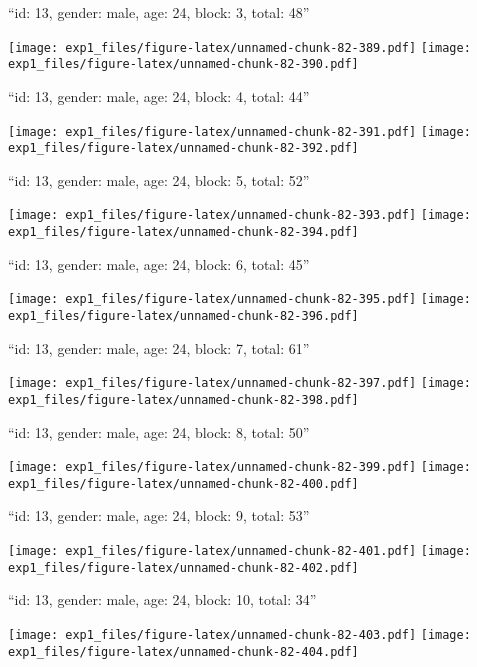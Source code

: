 \documentclass[11pt,,]{article}
\begin{document}
\newpage
[1] 

``id: 13, gender: male, age: 24, block: 3, total: 48''

\texttt{[image: exp1\_files/figure-latex/unnamed-chunk-82-389.pdf]}
\texttt{[image: exp1\_files/figure-latex/unnamed-chunk-82-390.pdf]}

\newpage
[1] 

``id: 13, gender: male, age: 24, block: 4, total: 44''

\texttt{[image: exp1\_files/figure-latex/unnamed-chunk-82-391.pdf]}
\texttt{[image: exp1\_files/figure-latex/unnamed-chunk-82-392.pdf]}

\newpage
[1] 

``id: 13, gender: male, age: 24, block: 5, total: 52''

\texttt{[image: exp1\_files/figure-latex/unnamed-chunk-82-393.pdf]}
\texttt{[image: exp1\_files/figure-latex/unnamed-chunk-82-394.pdf]}

\newpage
[1] 

``id: 13, gender: male, age: 24, block: 6, total: 45''

\texttt{[image: exp1\_files/figure-latex/unnamed-chunk-82-395.pdf]}
\texttt{[image: exp1\_files/figure-latex/unnamed-chunk-82-396.pdf]}

\newpage
[1] 

``id: 13, gender: male, age: 24, block: 7, total: 61''

\texttt{[image: exp1\_files/figure-latex/unnamed-chunk-82-397.pdf]}
\texttt{[image: exp1\_files/figure-latex/unnamed-chunk-82-398.pdf]}

\newpage
[1] 

``id: 13, gender: male, age: 24, block: 8, total: 50''

\texttt{[image: exp1\_files/figure-latex/unnamed-chunk-82-399.pdf]}
\texttt{[image: exp1\_files/figure-latex/unnamed-chunk-82-400.pdf]}

\newpage
[1] 

``id: 13, gender: male, age: 24, block: 9, total: 53''

\texttt{[image: exp1\_files/figure-latex/unnamed-chunk-82-401.pdf]}
\texttt{[image: exp1\_files/figure-latex/unnamed-chunk-82-402.pdf]}

\newpage
[1] 

``id: 13, gender: male, age: 24, block: 10, total: 34''

\texttt{[image: exp1\_files/figure-latex/unnamed-chunk-82-403.pdf]}
\texttt{[image: exp1\_files/figure-latex/unnamed-chunk-82-404.pdf]}
\end{document}
